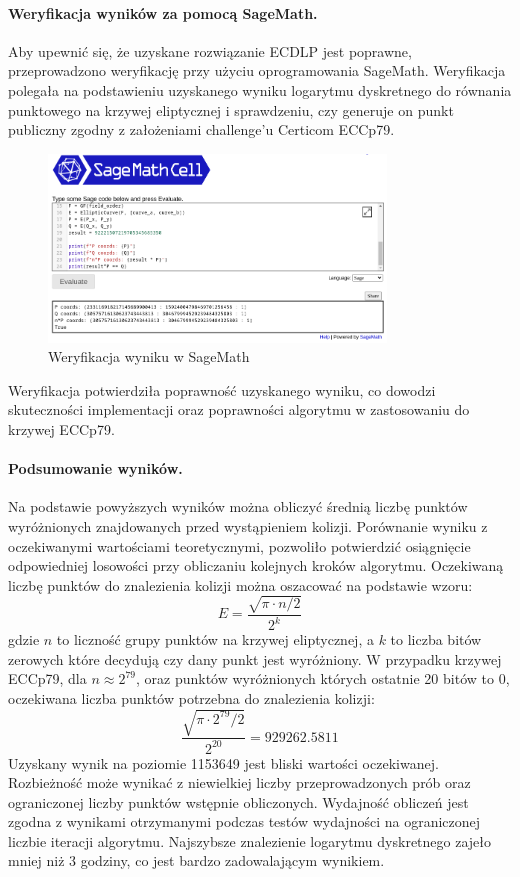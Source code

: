 \paragraph{Weryfikacja wyników za pomocą SageMath.}
Aby upewnić się, że uzyskane rozwiązanie ECDLP jest poprawne, przeprowadzono
weryfikację przy użyciu oprogramowania SageMath. Weryfikacja polegała na
podstawieniu uzyskanego wyniku logarytmu dyskretnego do równania punktowego
na krzywej eliptycznej i sprawdzeniu, czy generuje on punkt publiczny
zgodny z założeniami challenge'u Certicom ECCp79.

\begin{figure}[H]
    \centering
    \includegraphics[width=0.8\textwidth]{img/sage_check_full.png}
    \caption{Weryfikacja wyniku w SageMath}
    \label{fig:sage_verification}
\end{figure}

Weryfikacja potwierdziła poprawność uzyskanego wyniku, co dowodzi skuteczności
implementacji oraz poprawności algorytmu w zastosowaniu do krzywej ECCp79.

\paragraph{Podsumowanie wyników.}
Na podstawie powyższych wyników można obliczyć średnią liczbę punktów wyróżnionych
znajdowanych przed wystąpieniem kolizji.
Porównanie wyniku z oczekiwanymi wartościami teoretycznymi, pozwoliło potwierdzić
osiągnięcie odpowiedniej losowości przy obliczaniu kolejnych kroków algorytmu.
Oczekiwaną liczbę punktów do znalezienia kolizji można oszacować na podstawie wzoru:
$$
    E = \frac{\sqrt{\pi \cdot n / 2}}{2^k}
$$
gdzie $n$ to liczność grupy punktów na krzywej eliptycznej, a $k$ to liczba bitów zerowych które decydują
czy dany punkt jest wyróżniony. W przypadku krzywej ECCp79,
dla $n \approx 2^{79}$, oraz punktów wyróżnionych których ostatnie 20 bitów to $0$, oczekiwana liczba
punktów potrzebna do znalezienia kolizji:
$$
    \frac{\sqrt{\pi \cdot 2^{79} / 2}}{2^{20}} = 929262.5811
$$
Uzyskany wynik na poziomie 1153649 jest bliski wartości oczekiwanej. Rozbieżność może wynikać z niewielkiej
liczby przeprowadzonych prób oraz ograniczonej liczby punktów wstępnie obliczonych.
Wydajność obliczeń jest zgodna z wynikami otrzymanymi podczas testów wydajności na ograniczonej liczbie iteracji algorytmu.
Najszybsze znalezienie logarytmu dyskretnego zajeło mniej niż 3 godziny, co jest bardzo zadowalającym wynikiem.
